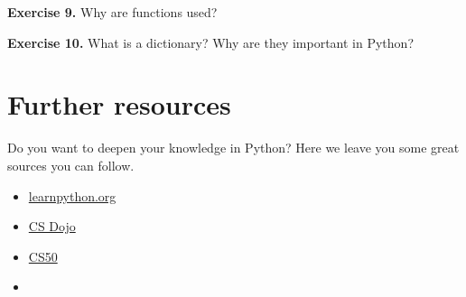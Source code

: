 \textbf{Exercise 9.} Why are functions used?

\textbf{Exercise 10.} What is a dictionary? Why are they important in Python?

\section{Further resources}
Do you want to deepen your knowledge in Python? Here we leave you some great sources you can follow. 

\begin{itemize}
    \item \href{https://www.learnpython.org/}{learnpython.org}
    \item \href{https://www.youtube.com/watch?v=Z1Yd7upQsXY&list=PLBZBJbE_rGRWeh5mIBhD-hhDwSEDxogDg}{CS Dojo}
    \item \href{https://www.youtube.com/watch?v=jjqgP9dpD1k&list=PL6beirVtPMMFDD_wzVb2g8CPfVrBuOAkI}{CS50}
    \item 
\end{itemize}